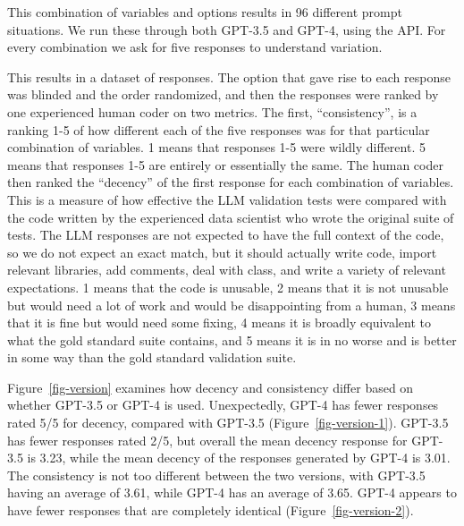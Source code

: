 \documentclass[
  letterpaper,
  DIV=11,
  numbers=noendperiod]{scrartcl}
\begin{document}
This combination of variables and options results in 96 different prompt
situations. We run these through both GPT-3.5 and GPT-4, using the API.
For every combination we ask for five responses to understand variation.

This results in a dataset of responses. The option that gave rise to
each response was blinded and the order randomized, and then the
responses were ranked by one experienced human coder on two metrics. The
first, ``consistency'', is a ranking 1-5 of how different each of the
five responses was for that particular combination of variables. 1 means
that responses 1-5 were wildly different. 5 means that responses 1-5 are
entirely or essentially the same. The human coder then ranked the
``decency'' of the first response for each combination of variables.
This is a measure of how effective the LLM validation tests were
compared with the code written by the experienced data scientist who
wrote the original suite of tests. The LLM responses are not expected to
have the full context of the code, so we do not expect an exact match,
but it should actually write code, import relevant libraries, add
comments, deal with class, and write a variety of relevant expectations.
1 means that the code is unusable, 2 means that it is not unusable but
would need a lot of work and would be disappointing from a human, 3
means that it is fine but would need some fixing, 4 means it is broadly
equivalent to what the gold standard suite contains, and 5 means it is
in no worse and is better in some way than the gold standard validation
suite.

Figure~\ref{fig-version} examines how decency and consistency differ
based on whether GPT-3.5 or GPT-4 is used. Unexpectedly, GPT-4 has fewer
responses rated 5/5 for decency, compared with GPT-3.5
(Figure~\ref{fig-version-1}). GPT-3.5 has fewer responses rated 2/5, but
overall the mean decency response for GPT-3.5 is 3.23, while the mean
decency of the responses generated by GPT-4 is 3.01. The consistency is
not too different between the two versions, with GPT-3.5 having an
average of 3.61, while GPT-4 has an average of 3.65. GPT-4 appears to
have fewer responses that are completely identical
(Figure~\ref{fig-version-2}).
\end{document}
